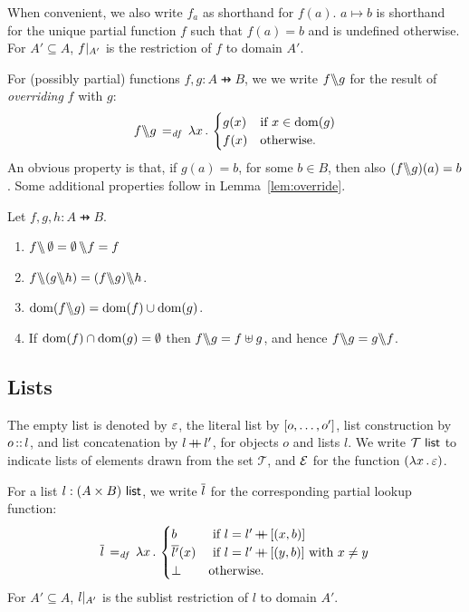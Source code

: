 \documentclass[11pt]{report}
\begin{document}
 When convenient, we also write $f_a$ as shorthand for $f(a)$. $a \mapsto b$ is shorthand for the unique partial function $f$ such that $f(a) = b$ and is undefined otherwise. For $A' \subseteq A$, $f |_{A'}$ is the restriction of $f$ to domain $A'$. 

For (possibly partial) functions $f,g : A \pfun B$, we we write $f \backslash\!\!\backslash g$ for the result of \emph{overriding} $f$ with $g$: \[ f \backslash\!\!\backslash g \operatorname{\;=_{\mathit{df}}\;} \lambda x\,.\, \begin{cases}
	g(x) & \text{if $x \in \operatorname{\mathrm{dom}}(g)$} \\
	f(x) & \text{otherwise.}
\end{cases} \] An obvious property is that, if $g(a) = b$, for some $b \in B$, then also $(f \backslash\!\!\backslash g)(a) = b$. Some additional properties follow in Lemma~\ref{lem:override}. 

\begin{lemma}
    \label{lem:override}
    Let $f,g,h : A \pfun B$. 
    \begin{enumerate}
        \item $f \backslash\!\!\backslash \operatorname{\emptyset} = \operatorname{\emptyset} \backslash\!\!\backslash f = f$
        \item $f \override (g \override h) = (f \override g) \override h$. 
        \item $\operatorname{\mathrm{dom}}(f \backslash\!\!\backslash g) = \operatorname{\mathrm{dom}}(f) \cup \operatorname{\mathrm{dom}}(g)$. 
        \item If $\operatorname{\mathrm{dom}}(f) \cap \operatorname{\mathrm{dom}}(g) = \operatorname{\emptyset}$ then $f \backslash\!\!\backslash g = f \uplus g$, and hence $f \backslash\!\!\backslash g = g \backslash\!\!\backslash f$. 
    \end{enumerate}
\end{lemma}

\subsection{Lists}
\label{sec:lists}

The empty list is denoted by $\varepsilon$, the literal list by $\left[o,\ldots, o'\right]$, list construction by $o \operatorname{:\!:} l$, and list concatenation by $l \operatorname{+\!\!\!+} l'$, for objects $o$ and lists $l$. We write $\mathcal{T}~\mathsf{list}$ to indicate lists of elements drawn from the set $\mathcal{T}$, and $\mathcal{E}$ for the function $(\lambda x\,.\, \varepsilon)$. 

For a list $l : (A \times B)~\mathsf{list}$, we write $\overline{l}$ for the corresponding partial lookup function: \[ \overline{l} \operatorname{\;=_{\mathit{df}}\;} \lambda x\,.\, \begin{cases}
	b &\text{ if $l = l' \operatorname{+\!\!\!+} \left[(x,b)\right]$}\\
	\overline{l'}(x) &\text{ if $l = l' \operatorname{+\!\!\!+} \left[(y,b)\right]$ with $x \neq y$}\\
	\bot & \text{otherwise.}
\end{cases}\] For $A' \subseteq A$, $l |_{A'}$ is the sublist restriction of $l$ to domain $A'$.
\end{document}
